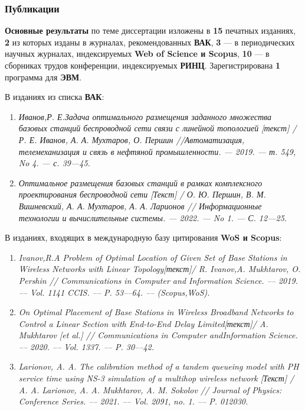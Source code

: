 \begin{frame}
    \frametitle{Публикации}
    \fontsize{7pt}{7.2}\selectfont

    \textbf{Основные результаты} по теме диссертации изложены в \textbf{15} печатных изданиях, \textbf{2} из которых изданы в журналах, рекомендованных \textbf{ВАК}, \textbf{3} — в периодических научных журналах, индексируемых \textbf{Web of Science и Scopus}, \textbf{10} — в сборниках трудов конференции, индексируемых \textbf{РИНЦ}. Зарегистрирована \textbf{1} программа для \textbf{ЭВМ}. 
    
    \bigskip
    
    В изданиях из списка \textbf{ВАК}: 
    \begin{enumerate}
        \item \textit{Иванов,Р. Е.Задача оптимального размещения заданного множе­ства базовых станций беспроводной сети связи с линейной топо­логией [текст] / Р. Е. Иванов, А. А. Мухтаров, О. Першин //Автоматизация, телемеханизация и связь в нефтяной промышлен­ности. — 2019. — т. 549, No 4. — с. 39—45.}
        \item \textit{Оптимальное размещения базовых станций в рамках комплексного проектирования беспроводной сети [Текст] / О. Ю. Першин, В. М. Вишневский, А. А. Мухтаров, А. А. Ларионов // Информационные технологии и вычислительные системы. — 2022. — No 1. — С. 12—25.}
    \end{enumerate}

    \bigskip

    В изданиях, входящих в международную базу цитирования \textbf{WoS и Scopus}:

    \begin{enumerate}
        \item \textit{Ivanov,R.A Problem of Optimal Location of Given Set of Base Sta­tions in Wireless Networks with Linear Topology[текст]/ R. Ivanov,A. Mukhtarov, O. Pershin // Communications in Computer and Infor­mation Science. –– 2019. –– Vol. 1141 CCIS. –– P. 53––64. –– (Scopus,WoS).}
        \item  \textit{On Optimal Placement of Base Stations in Wireless Broadband Net­works to Control a Linear Section with End-to-End Delay Limited[текст]/ A. Mukhtarov [et al.] // Communications in Computer andInformation Science. –– 2020. –– Vol. 1337. –– P. 30––42.}
        \item \textit{Larionov, A. A. The calibration method of a tandem queueing model with PH service time using NS-3 simulation of a multihop wireless network [Текст] / A. A. Larionov, A. A. Mukhtarov, A. M. Sokolov // Journal of Physics: Conference Series. –– 2021. –– Vol. 2091, no. 1. –– P. 012030.}
    \end{enumerate}
    
\end{frame}

